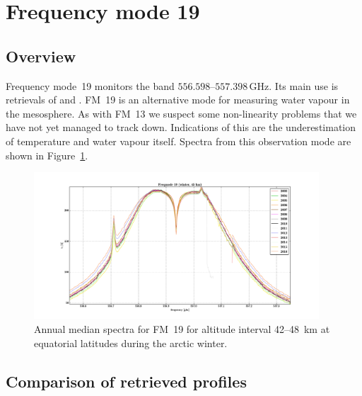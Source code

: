 \section{Frequency mode 19}
\label{sec:fm19}

\subsection{Overview}
\label{sec:fm19:overview}
Frequency mode~19 monitors the band $556.598$--$557.398\,\mathrm{GHz}$. Its
main use is retrievals of  and .
FM~19 is an alternative mode for measuring water vapour in the mesosphere. As
with FM~13 we suspect some non-linearity problems that we have not yet managed
to track down.  Indications of this are the underestimation of temperature and
water vapour itself.
Spectra from this observation mode are shown in Figure~\ref{fig:spectra:19}.

\begin{figure}[ht]
    \centering
    \includegraphics[width=0.95\textwidth]{../DDS/figures/spectra/fm_19_spectra_winter_45km}
    \caption{Annual median spectra for FM~19 for altitude interval 42--48~km at
        equatorial latitudes during the arctic winter.
    }\label{fig:spectra:19}
\end{figure}


\subsection{Comparison of retrieved profiles}
\label{sec:fm19:comparison}




